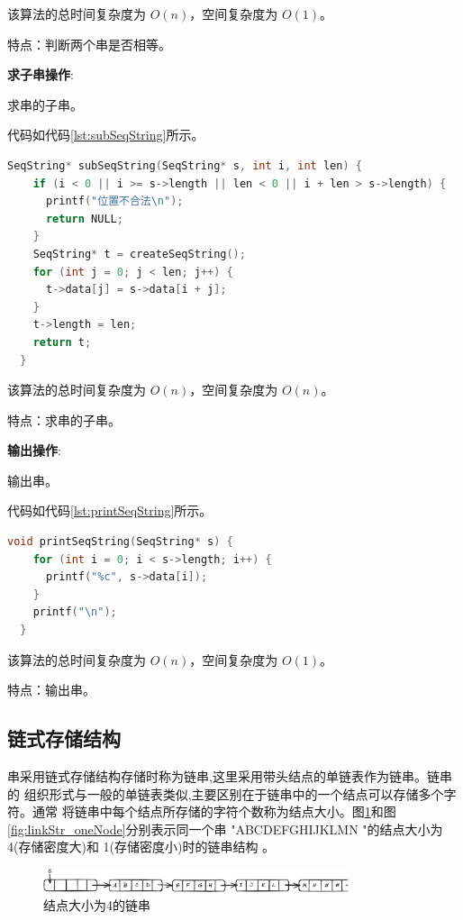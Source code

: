 \documentclass[lang=cn,newtx,10pt,scheme=chinese]{elegantbook}
\begin{document}
该算法的总时间复杂度为 $O(n)$，空间复杂度为 $O(1)$。

特点：判断两个串是否相等。

\textbf{求子串操作}:

求串的子串。

代码如代码\ref{lst:subSeqString}所示。

\begin{lstlisting}[language=C++, caption={求串的子串示例代码}, label={lst:subSeqString}]
  SeqString* subSeqString(SeqString* s, int i, int len) {
    if (i < 0 || i >= s->length || len < 0 || i + len > s->length) {
      printf("位置不合法\n");
      return NULL;
    }
    SeqString* t = createSeqString();
    for (int j = 0; j < len; j++) {
      t->data[j] = s->data[i + j];
    }
    t->length = len;
    return t;
  }

\end{lstlisting}

该算法的总时间复杂度为 $O(n)$，空间复杂度为 $O(n)$。

特点：求串的子串。

\textbf{输出操作}:

输出串。

代码如代码\ref{lst:printSeqString}所示。

\begin{lstlisting}[language=C++, caption={输出串示例代码}, label={lst:printSeqString}]
  void printSeqString(SeqString* s) {
    for (int i = 0; i < s->length; i++) {
      printf("%c", s->data[i]);
    }
    printf("\n");
  }

\end{lstlisting}

该算法的总时间复杂度为 $O(n)$，空间复杂度为 $O(1)$。

特点：输出串。


\subsection{链式存储结构}

串采用链式存储结构存储时称为链串,这里采用带头结点的单链表作为链串。链串的
组织形式与一般的单链表类似,主要区别在于链串中的一个结点可以存储多个字符。通常
将链串中每个结点所存储的字符个数称为结点大小。图\ref{fig:linkStr_fourNodes}和图 \ref{fig:linkStr_oneNode}分别表示同一个串
"ABCDEFGHIJKLMN "的结点大小为 4(存储密度大)和 1(存储密度小)时的链串结构 。


\begin{figure}[h]
  \centering
  \includegraphics[width=0.8\textwidth]{./figure/pdf/cropped/linkStr_fourNodes.pdf}
  \caption{结点大小为4的链串}
  \label{fig:linkStr_fourNodes}

\end{figure}
\end{document}
